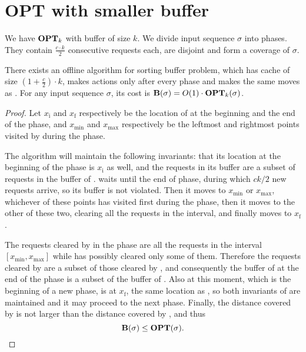 \section{OPT with smaller buffer}
We have $\operatorname{\mathbf{OPT}}_k$ with buffer of size $k$. We divide input sequence $\sigma$ into
phases. They contain $\frac{c \cdot k}{2}$ consecutive requests each, are
disjoint and form a coverage of $\sigma$.

\begin{lemma}\label{lem:algorithm_B}
There exists an offline algorithm \fazowy{} for sorting buffer problem, which
has cache of size $(1 + \frac{c}{2}) \cdot k$, makes actions only after every
phase and makes the same moves as \opt{}. For any input sequence $\sigma$, its
cost is $\operatorname{\mathbf{B}}(\sigma) = O(1) \cdot \operatorname{\mathbf{OPT}}_k(\sigma)$.
\end{lemma}

\begin{proof}
Let $x_\text{i}$ and $x_\text{f}$ respectively be the location of \opt{} at 
the beginning and the end of the phase, and $x_\text{min}$ and $x_\text{max}$ 
respectively be the leftmost and rightmost points visited by \opt{} during the 
phase.

The algorithm \fazowy{} will maintain the following invariants: that its 
location at the beginning of the phase is $x_\text{i}$ as well, and the 
requests in its buffer are a subset of requests in the buffer of \opt. 
\fazowy{} waits until the end of phase, during which $ck/2$ new requests 
arrive, so its buffer is not violated. Then it moves to $x_\text{min}$ or 
$x_\text{max}$, whichever of these points \opt{} has visited first during the 
phase, then it moves to the other of these two, clearing all the requests in 
the interval, and finally moves to $x_\text{f}$.

The requests cleared by \fazowy{} in the phase are all the requests in the 
interval $[x_\text{min},x_\text{max}]$ while \opt{} has possibly cleared only 
some of them.
Therefore the requests cleared by \opt{} are a subset of those cleared by 
\fazowy, and consequently the buffer of \fazowy{} at the end of the phase is a 
subset of the buffer of \opt. Also at this moment, which is the beginning of a 
new phase, \fazowy{} is at $x_\text{f}$, the same location as \opt, so both 
invariants of \fazowy{} are maintained and it may proceed to the next phase. 
Finally, the distance covered by \fazowy{} is not larger than the distance 
covered by \opt{}, and thus
\[ \operatorname{\mathbf{B}}(\sigma) \leq \operatorname{\mathbf{OPT}}(\sigma). \qedhere \]
\end{proof}

